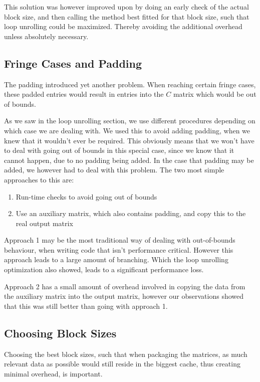 \documentclass[a4paper,11pt,oneside]{book}
\begin{document}
This solution was however improved upon by doing an early check of the actual block
size, and then calling the method best fitted for that block size, such that
loop unrolling could be maximized. Thereby avoiding the additional overhead unless
absolutely necessary.

\subsection{Fringe Cases and Padding}

The padding introduced yet another problem. When reaching certain fringe
cases, these padded entries would result in entries into the $C$ matrix which
would be out of bounds.

As we saw in the loop unrolling section, we use different procedures depending
on which case we are dealing with. We used this to avoid adding padding, when we
knew that it wouldn't ever be required. This obviously means that we won't have
to deal with going out of bounds in this special case, since we know that it
cannot happen, due to no padding being added. In the case that padding may be
added, we however had to deal with this problem. The two most simple approaches 
to this are:

\begin{enumerate}
  \item Run-time checks to avoid going out of bounds
  \item Use an auxiliary matrix, which also contains padding, and copy this to 
        the real output matrix
\end{enumerate}

Approach 1 may be the most traditional way of dealing with out-of-bounds
behaviour, when writing code that isn't performance critical. However this
approach leads to a large amount of branching. Which the loop unrolling
optimization also showed, leads to a significant performance loss.

Approach 2 has a small amount of overhead involved in copying the data from the
auxiliary matrix into the output matrix, however our observations showed that
this was still better than going with approach 1.


\subsection{Choosing Block Sizes}
Choosing the best block sizes, such that when packaging the matrices, as much
relevant data as possible would still reside in the biggest cache, thus creating
minimal overhead, is important.
\end{document}
